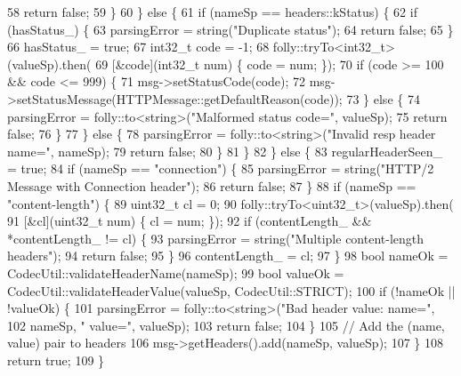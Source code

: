 \begin{DoxyCode}
58         \textcolor{keywordflow}{return} \textcolor{keyword}{false};
59       \}
60     \} \textcolor{keywordflow}{else} \{
61       \textcolor{keywordflow}{if} (nameSp == headers::kStatus) \{
62         \textcolor{keywordflow}{if} (hasStatus_) \{
63           parsingError = string(\textcolor{stringliteral}{"Duplicate status"});
64           \textcolor{keywordflow}{return} \textcolor{keyword}{false};
65         \}
66         hasStatus_ = \textcolor{keyword}{true};
67         int32\_t code = -1;
68         folly::tryTo<int32\_t>(valueSp).then(
69             [&code](int32\_t num) \{ code = num; \});
70         \textcolor{keywordflow}{if} (code >= 100 && code <= 999) \{
71           msg->setStatusCode(code);
72           msg->setStatusMessage(HTTPMessage::getDefaultReason(code));
73         \} \textcolor{keywordflow}{else} \{
74           parsingError = folly::to<string>(\textcolor{stringliteral}{"Malformed status code="}, valueSp);
75           \textcolor{keywordflow}{return} \textcolor{keyword}{false};
76         \}
77       \} \textcolor{keywordflow}{else} \{
78         parsingError = folly::to<string>(\textcolor{stringliteral}{"Invalid resp header name="}, nameSp);
79         \textcolor{keywordflow}{return} \textcolor{keyword}{false};
80       \}
81     \}
82   \} \textcolor{keywordflow}{else} \{
83     regularHeaderSeen_ = \textcolor{keyword}{true};
84     \textcolor{keywordflow}{if} (nameSp == \textcolor{stringliteral}{"connection"}) \{
85       parsingError = string(\textcolor{stringliteral}{"HTTP/2 Message with Connection header"});
86       \textcolor{keywordflow}{return} \textcolor{keyword}{false};
87     \}
88     \textcolor{keywordflow}{if} (nameSp == \textcolor{stringliteral}{"content-length"}) \{
89       uint32\_t cl = 0;
90       folly::tryTo<uint32\_t>(valueSp).then(
91           [&cl](uint32\_t num) \{ cl = num; \});
92       \textcolor{keywordflow}{if} (contentLength_ && *contentLength_ != cl) \{
93         parsingError = string(\textcolor{stringliteral}{"Multiple content-length headers"});
94         \textcolor{keywordflow}{return} \textcolor{keyword}{false};
95       \}
96       contentLength_ = cl;
97     \}
98     \textcolor{keywordtype}{bool} nameOk = CodecUtil::validateHeaderName(nameSp);
99     \textcolor{keywordtype}{bool} valueOk = CodecUtil::validateHeaderValue(valueSp, CodecUtil::STRICT);
100     \textcolor{keywordflow}{if} (!nameOk || !valueOk) \{
101       parsingError = folly::to<string>(\textcolor{stringliteral}{"Bad header value: name="},
102                                        nameSp, \textcolor{stringliteral}{" value="}, valueSp);
103       \textcolor{keywordflow}{return} \textcolor{keyword}{false};
104     \}
105     \textcolor{comment}{// Add the (name, value) pair to headers}
106     msg->getHeaders().add(nameSp, valueSp);
107   \}
108   \textcolor{keywordflow}{return} \textcolor{keyword}{true};
109 \}
\end{DoxyCode}
